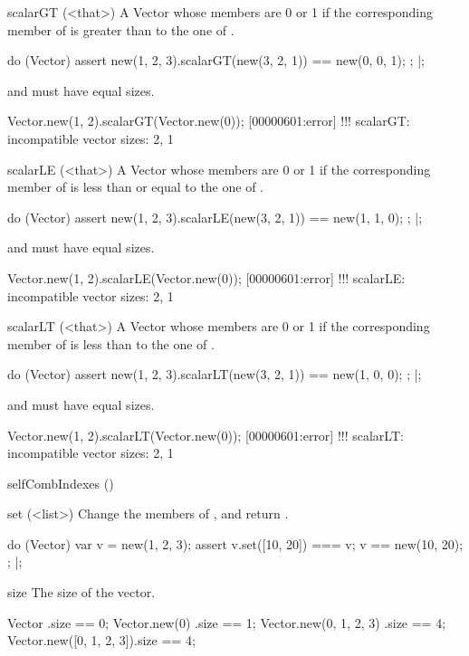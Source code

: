 \begin{urbiscriptapi}
\item[scalarGT](<that>)%
  A Vector whose members are 0 or 1 if the corresponding member of \this is
  greater than to the one of \that.
\begin{urbiscript}
do (Vector)
{
  assert
  {
    new(1, 2, 3).scalarGT(new(3, 2, 1)) == new(0, 0, 1);
  };
}|;
\end{urbiscript}
  \this and \that must have equal sizes.
\begin{urbiscript}
Vector.new(1, 2).scalarGT(Vector.new(0));
[00000601:error] !!! scalarGT: incompatible vector sizes: 2, 1
\end{urbiscript}

\item[scalarLE](<that>)%
  A Vector whose members are 0 or 1 if the corresponding member of \this is
  less than or equal to the one of \that.
\begin{urbiscript}
do (Vector)
{
  assert
  {
    new(1, 2, 3).scalarLE(new(3, 2, 1)) == new(1, 1, 0);
  };
}|;
\end{urbiscript}
  \this and \that must have equal sizes.
\begin{urbiscript}
Vector.new(1, 2).scalarLE(Vector.new(0));
[00000601:error] !!! scalarLE: incompatible vector sizes: 2, 1
\end{urbiscript}

\item[scalarLT](<that>)%
  A Vector whose members are 0 or 1 if the corresponding member of \this is
  less than to the one of \that.
\begin{urbiscript}
do (Vector)
{
  assert
  {
    new(1, 2, 3).scalarLT(new(3, 2, 1)) == new(1, 0, 0);
  };
}|;
\end{urbiscript}
  \this and \that must have equal sizes.
\begin{urbiscript}
Vector.new(1, 2).scalarLT(Vector.new(0));
[00000601:error] !!! scalarLT: incompatible vector sizes: 2, 1
\end{urbiscript}

\item[selfCombIndexes]()%

\item[set](<list>)%
  Change the members of \this, and return \this.
\begin{urbiscript}
do (Vector)
{
  var v = new(1, 2, 3);
  assert
  {
    v.set([10, 20]) === v;
    v == new(10, 20);
  };
}|;
\end{urbiscript}

\item[size]%
  The size of the vector.
\begin{urbiassert}
Vector                  .size == 0;
Vector.new(0)           .size == 1;
Vector.new(0, 1, 2, 3)  .size == 4;
Vector.new([0, 1, 2, 3]).size == 4;
\end{urbiassert}


\end{urbiscriptapi}
